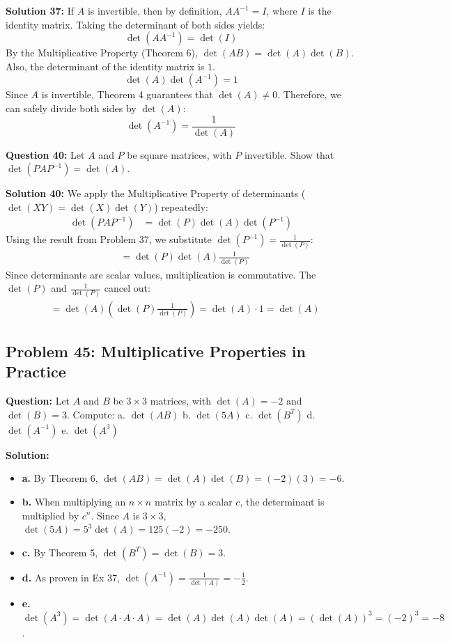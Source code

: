\documentclass{article}
\begin{document}
\textbf{Solution 37:}
If $A$ is invertible, then by definition, $A A^{-1} = I$, where $I$ is the identity matrix.
Taking the determinant of both sides yields:
\[ \det(A A^{-1}) = \det(I) \]
By the Multiplicative Property (Theorem 6), $\det(AB) = \det(A)\det(B)$. Also, the determinant of the identity matrix is $1$.
\[ \det(A) \det(A^{-1}) = 1 \]
Since $A$ is invertible, Theorem 4 guarantees that $\det(A) \neq 0$. Therefore, we can safely divide both sides by $\det(A)$:
\[ \det(A^{-1}) = \frac{1}{\det(A)} \]

\textbf{Question 40:} Let $A$ and $P$ be square matrices, with $P$ invertible. Show that $\det(PAP^{-1}) = \det(A)$.

\textbf{Solution 40:}
We apply the Multiplicative Property of determinants ($\det(XY) = \det(X)\det(Y)$) repeatedly:
\begin{align*}
    \det(PAP^{-1}) &= \det(P) \det(A) \det(P^{-1})
\end{align*}
Using the result from Problem 37, we substitute $\det(P^{-1}) = \frac{1}{\det(P)}$:
\begin{align*}
    &= \det(P) \det(A) \frac{1}{\det(P)}
\end{align*}
Since determinants are scalar values, multiplication is commutative. The $\det(P)$ and $\frac{1}{\det(P)}$ cancel out:
\begin{align*}
    &= \det(A) \left( \det(P) \frac{1}{\det(P)} \right) = \det(A) \cdot 1 = \det(A)
\end{align*}

\subsection{Problem 45: Multiplicative Properties in Practice}
\textbf{Question:} Let $A$ and $B$ be $3 \times 3$ matrices, with $\det(A) = -2$ and $\det(B) = 3$. Compute:
a. $\det(AB)$ \quad b. $\det(5A)$ \quad c. $\det(B^T)$ \quad d. $\det(A^{-1})$ \quad e. $\det(A^3)$

\textbf{Solution:}
\begin{itemize}
    \item \textbf{a.} By Theorem 6, $\det(AB) = \det(A)\det(B) = (-2)(3) = -6$.
    \item \textbf{b.} When multiplying an $n \times n$ matrix by a scalar $c$, the determinant is multiplied by $c^n$. Since $A$ is $3 \times 3$, $\det(5A) = 5^3 \det(A) = 125(-2) = -250$.
    \item \textbf{c.} By Theorem 5, $\det(B^T) = \det(B) = 3$.
    \item \textbf{d.} As proven in Ex 37, $\det(A^{-1}) = \frac{1}{\det(A)} = -\frac{1}{2}$.
    \item \textbf{e.} $\det(A^3) = \det(A \cdot A \cdot A) = \det(A)\det(A)\det(A) = (\det(A))^3 = (-2)^3 = -8$.
\end{itemize}
\end{document}
